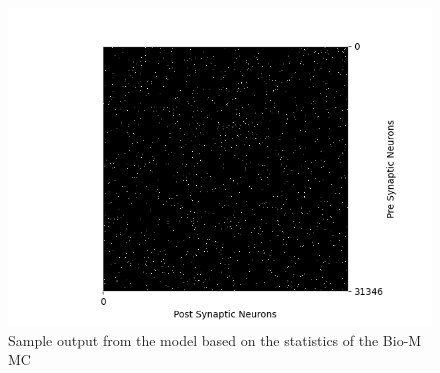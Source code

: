 \begin{figure}[H]
\begin{center}
\captionsetup{justification=centering}
\includegraphics[width=12cm]{ER/matrix_Erdos-Renyi.png}
\caption{Sample output from the \ER model based on the statistics of the Bio-M MC}
\end{center}
\end{figure}
